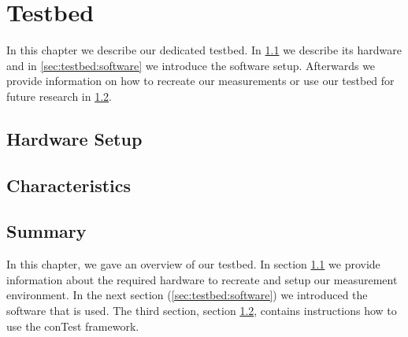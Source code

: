 \chapter{Testbed}
\label{chap:testbed}
In this chapter we describe our dedicated testbed. In \ref{sec:testbed:hardware} we describe its hardware and in \ref{sec:testbed:software} we introduce the software setup. 
Afterwards we provide information on how to recreate our measurements or use our testbed for future research in \ref{sec:testbed:characteristics}.


\section{Hardware Setup}
\label{sec:testbed:hardware}



\section{Characteristics}
\label{sec:testbed:characteristics}



\section{Summary}
\label{sec:conclusion}

In this chapter, we gave an overview of our testbed. In section \ref{sec:testbed:hardware} we provide information about the required hardware to recreate and setup our measurement environment. In the next section (\ref{sec:testbed:software}) we introduced the software that is used. 
The third section, section \ref{sec:testbed:characteristics}, contains instructions how to use the conTest framework.
%
